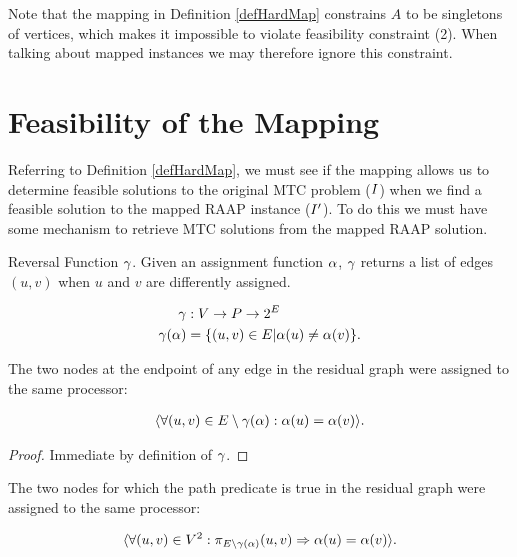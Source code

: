 Note that the mapping in Definition \ref{defHardMap} constrains $A$ to be singletons of vertices, which makes it impossible to violate feasibility constraint (2).
When talking about mapped instances we may therefore ignore this constraint.

\section{Feasibility of the Mapping}
\label{secHardFeas}

Referring to Definition \ref{defHardMap}, we must see if the mapping allows us to determine feasible solutions to the original MTC problem ($I$) when we find a feasible solution to the mapped RAAP instance ($I'$).
To do this we must have some mechanism to retrieve MTC solutions from the mapped RAAP solution.

\begin{definition}
Reversal Function $\gamma$.
Given an assignment function $\alpha$, $\gamma$ returns a list of edges $(u, v)$ when $u$ and $v$ are differently assigned.

\begin{align}
	\nonumber \gamma & : V \rightarrow P \rightarrow 2^E \\
	\nonumber \gamma(\alpha) & = \{(u,v) \in E | \alpha(u) \neq \alpha(v)\} .
\end{align}
\end{definition}

\begin{lemma}
\label{EDGEASSIGN}
The two nodes at the endpoint of any edge in the residual graph were assigned to the same processor:

\begin{align}
	\nonumber \langle \forall(u, v) \in E \setminus \gamma(\alpha) : \alpha(u) = \alpha(v) \rangle .
\end{align}
\end{lemma}

\begin{proof}
Immediate by definition of $\gamma$.
\end{proof}

\begin{lemma}
\label{PATHASSIGN}
The two nodes for which the path predicate is true in the residual graph were assigned to the same processor:

\begin{align}
	\nonumber \langle \forall (u, v) \in V^2 : \pi_{E \setminus \gamma(\alpha)}(u, v) \Rightarrow \alpha(u) = \alpha(v) \rangle .
\end{align}
\end{lemma}

